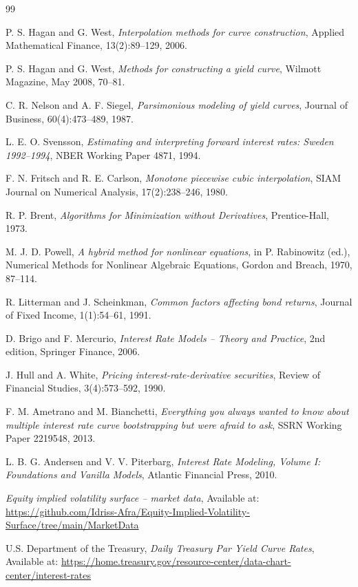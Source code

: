 \documentclass[11pt,a4paper]{article}
\theoremstyle{plain}
\theoremstyle{definition}
\begin{document}
\begin{thebibliography}{99}

P. S. Hagan and G. West,
\textit{Interpolation methods for curve construction},
Applied Mathematical Finance, 13(2):89--129, 2006.

P. S. Hagan and G. West,
\textit{Methods for constructing a yield curve},
Wilmott Magazine, May 2008, 70--81.

C. R. Nelson and A. F. Siegel,
\textit{Parsimonious modeling of yield curves},
Journal of Business, 60(4):473--489, 1987.

L. E. O. Svensson,
\textit{Estimating and interpreting forward interest rates: Sweden 1992--1994},
NBER Working Paper 4871, 1994.

F. N. Fritsch and R. E. Carlson,
\textit{Monotone piecewise cubic interpolation},
SIAM Journal on Numerical Analysis, 17(2):238--246, 1980.

R. P. Brent,
\textit{Algorithms for Minimization without Derivatives},
Prentice-Hall, 1973.

M. J. D. Powell,
\textit{A hybrid method for nonlinear equations},
in P. Rabinowitz (ed.), Numerical Methods for Nonlinear Algebraic Equations, Gordon and Breach, 1970, 87--114.

R. Litterman and J. Scheinkman,
\textit{Common factors affecting bond returns},
Journal of Fixed Income, 1(1):54--61, 1991.

D. Brigo and F. Mercurio,
\textit{Interest Rate Models -- Theory and Practice},
2nd edition, Springer Finance, 2006.

J. Hull and A. White,
\textit{Pricing interest-rate-derivative securities},
Review of Financial Studies, 3(4):573--592, 1990.

F. M. Ametrano and M. Bianchetti,
\textit{Everything you always wanted to know about multiple interest rate curve bootstrapping but were afraid to ask},
SSRN Working Paper 2219548, 2013.

L. B. G. Andersen and V. V. Piterbarg,
\textit{Interest Rate Modeling, Volume I: Foundations and Vanilla Models},
Atlantic Financial Press, 2010.

\textit{Equity implied volatility surface -- market data},
Available at: \url{https://github.com/Idriss-Afra/Equity-Implied-Volatility-Surface/tree/main/MarketData}

U.S. Department of the Treasury,
\textit{Daily Treasury Par Yield Curve Rates},
Available at: \url{https://home.treasury.gov/resource-center/data-chart-center/interest-rates}

\end{thebibliography}
\end{document}
